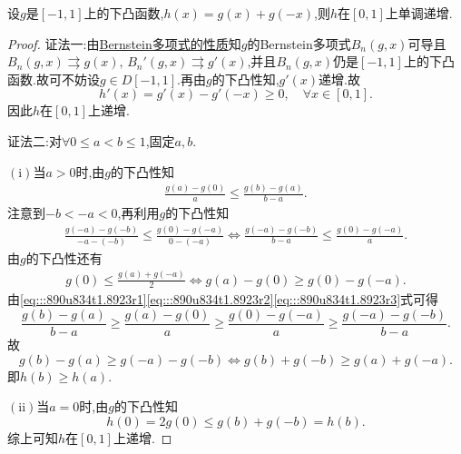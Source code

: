\documentclass[../../main.tex]{subfiles}%
\begin{document}
\begin{proposition}\label{proposition:下凸函数可构造右半递增偶函数}
设$g$是$[-1,1]$上的下凸函数,$h(x)=g(x)+g(-x)$,则$h$在$[0,1]$上单调递增.
\end{proposition}
\begin{proof}

{\color{blue}证法一:}由\hyperref[theorem:Bernstein多项式的性质]{Bernstein多项式的性质}知$g$的Bernstein多项式$B_n(g,x)$可导且$B_n(g,x) \rightrightarrows  g(x),\, B_n'(g,x)\rightrightarrows  g'(x)$,并且$B_n(g,x)$仍是$[-1,1]$上的下凸函数.故可不妨设$g\in D[-1,1]$.再由$g$的下凸性知,$g'(x)$递增.故
$$
h'(x)=g'(x)-g'(-x)\geqslant 0,\quad \forall x\in [0,1].
$$
因此$h$在$[0,1]$上递增.

{\color{blue}证法二:}对$\forall 0\leqslant a<b\leqslant 1$,固定$a,b.$

$\left( \mathrm{i} \right)$当$a>0$时,由$g$的下凸性知
\begin{align}\label{eq:::890u834t1.8923r1}
\frac{g\left( a \right) -g\left( 0 \right)}{a}\leqslant \frac{g\left( b \right) -g\left( a \right)}{b-a}.
\end{align}
注意到$-b<-a<0$,再利用$g$的下凸性知
\begin{align}\label{eq:::890u834t1.8923r2}
\frac{g\left( -a \right) -g\left( -b \right)}{-a-\left( -b \right)}\leqslant \frac{g\left( 0 \right) -g\left( -a \right)}{0-\left( -a \right)}\Longleftrightarrow \frac{g\left( -a \right) -g\left( -b \right)}{b-a}\leqslant \frac{g\left( 0 \right) -g\left( -a \right)}{a}.
\end{align}
由$g$的下凸性还有
\begin{align}\label{eq:::890u834t1.8923r3}
g\left( 0 \right) \leqslant \frac{g\left( a \right) +g\left( -a \right)}{2}\Longleftrightarrow g\left( a \right) -g\left( 0 \right) \geqslant g\left( 0 \right) -g\left( -a \right).
\end{align}
由\eqref{eq:::890u834t1.8923r1}\eqref{eq:::890u834t1.8923r2}\eqref{eq:::890u834t1.8923r3}式可得
$$\frac{g\left( b \right) -g\left( a \right)}{b-a}\geqslant \frac{g\left( a \right) -g\left( 0 \right)}{a}\geqslant \frac{g\left( 0 \right) -g\left( -a \right)}{a}\geqslant \frac{g\left( -a \right) -g\left( -b \right)}{b-a}.$$
故
$$g\left( b \right) -g\left( a \right) \geqslant g\left( -a \right) -g\left( -b \right) \Longleftrightarrow g\left( b \right) +g\left( -b \right) \geqslant g\left( a \right) +g\left( -a \right).$$
即$h\left( b \right) \geqslant h\left( a \right)$.

$\left( \mathrm{ii} \right)$当$a=0$时,由$g$的下凸性知
$$h\left( 0 \right) =2g\left( 0 \right) \leqslant g\left( b \right) +g\left( -b \right) =h\left( b \right).$$
综上可知$h$在$\left[ 0,1 \right]$上递增.

\end{proof}
\end{document}
